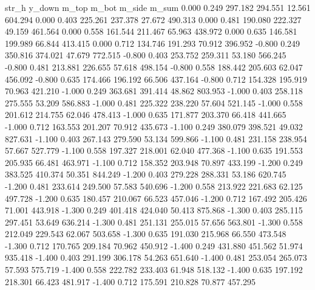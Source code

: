str_h	y_down	m_top	m_bot	m_side	m_sum
0.000 	 0.249 	 297.182 	 294.551 	 12.561 	 604.294
0.000 	 0.403 	 225.261 	 237.378 	 27.672 	 490.313
0.000 	 0.481 	 190.080 	 222.327 	 49.159 	 461.564
0.000 	 0.558 	 161.544 	 211.467 	 65.963 	 438.972
0.000 	 0.635 	 146.581 	 199.989 	 66.844 	 413.415
0.000 	 0.712 	 134.746 	 191.293 	 70.912 	 396.952
-0.800 	 0.249 	 350.816 	 374.021 	 47.679 	 772.515
-0.800 	 0.403 	 253.752 	 259.311 	 53.180 	 566.245
-0.800 	 0.481 	 213.881 	 226.655 	 57.618 	 498.154
-0.800 	 0.558 	 188.442 	 205.603 	 62.047 	 456.092
-0.800 	 0.635 	 174.466 	 196.192 	 66.506 	 437.164
-0.800 	 0.712 	 154.328 	 195.919 	 70.963 	 421.210
-1.000 	 0.249 	 363.681 	 391.414 	 48.862 	 803.953
-1.000 	 0.403 	 258.118 	 275.555 	 53.209 	 586.883
-1.000 	 0.481 	 225.322 	 238.220 	 57.604 	 521.145
-1.000 	 0.558 	 201.612 	 214.755 	 62.046 	 478.413
-1.000 	 0.635 	 171.877 	 203.370 	 66.418 	 441.665
-1.000 	 0.712 	 163.553 	 201.207 	 70.912 	 435.673
-1.100 	 0.249 	 380.079 	 398.521 	 49.032 	 827.631
-1.100 	 0.403 	 267.143 	 279.590 	 53.134 	 599.866
-1.100 	 0.481 	 231.158 	 238.954 	 57.667 	 527.779
-1.100 	 0.558 	 197.327 	 218.001 	 62.040 	 477.368
-1.100 	 0.635 	 191.553 	 205.935 	 66.481 	 463.971
-1.100 	 0.712 	 158.352 	 203.948 	 70.897 	 433.199
-1.200 	 0.249 	 383.525 	 410.374 	 50.351 	 844.249
-1.200 	 0.403 	 279.228 	 288.331 	 53.186 	 620.745
-1.200 	 0.481 	 233.614 	 249.500 	 57.583 	 540.696
-1.200 	 0.558 	 213.922 	 221.683 	 62.125 	 497.728
-1.200 	 0.635 	 180.457 	 210.067 	 66.523 	 457.046
-1.200 	 0.712 	 167.492 	 205.426 	 71.001 	 443.918
-1.300 	 0.249 	 401.418 	 424.040 	 50.413 	 875.868
-1.300 	 0.403 	 285.115 	 297.451 	 53.649 	 636.214
-1.300 	 0.481 	 251.131 	 255.015 	 57.656 	 563.801
-1.300 	 0.558 	 212.049 	 229.543 	 62.067 	 503.658
-1.300 	 0.635 	 191.030 	 215.968 	 66.550 	 473.548
-1.300 	 0.712 	 170.765 	 209.184 	 70.962 	 450.912
-1.400 	 0.249 	 431.880 	 451.562 	 51.974 	 935.418
-1.400 	 0.403 	 291.199 	 306.178 	 54.263 	 651.640
-1.400 	 0.481 	 253.054 	 265.073 	 57.593 	 575.719
-1.400 	 0.558 	 222.782 	 233.403 	 61.948 	 518.132
-1.400 	 0.635 	 197.192 	 218.301 	 66.423 	 481.917
-1.400 	 0.712 	 175.591 	 210.828 	 70.877 	 457.295

